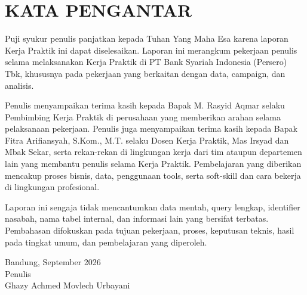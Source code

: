 \chapter*{KATA PENGANTAR}
Puji syukur penulis panjatkan kepada Tuhan Yang Maha Esa karena laporan Kerja Praktik ini dapat diselesaikan. Laporan ini merangkum pekerjaan penulis selama melaksanakan Kerja Praktik di PT Bank Syariah Indonesia (Persero) Tbk, khususnya pada pekerjaan yang berkaitan dengan data, campaign, dan analisis.

Penulis menyampaikan terima kasih kepada Bapak M. Rasyid Aqmar selaku Pembimbing Kerja Praktik di perusahaan yang memberikan arahan selama pelaksanaan pekerjaan. Penulis juga menyampaikan terima kasih kepada Bapak Fitra Arifiansyah, S.Kom., M.T. selaku Dosen Kerja Praktik, Mas Irsyad dan Mbak Sekar, serta rekan-rekan di lingkungan kerja dari tim ataupun departemen lain yang membantu penulis selama Kerja Praktik. Pembelajaran yang diberikan mencakup proses bisnis, data, penggunaan tools, serta soft-skill dan cara bekerja di lingkungan profesional.

Laporan ini sengaja tidak mencantumkan data mentah, query lengkap, identifier nasabah, nama tabel internal, dan informasi lain yang bersifat terbatas. Pembahasan difokuskan pada tujuan pekerjaan, proses, keputusan teknis, hasil pada tingkat umum, dan pembelajaran yang diperoleh.

\begin{flushright}
Bandung, September 2026\\
Penulis\\
\vspace{1.5cm}
Ghazy Achmed Movlech Urbayani
\end{flushright}
